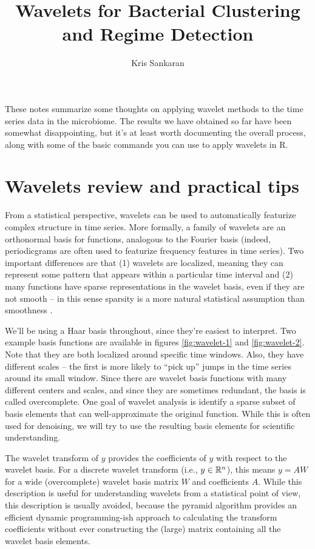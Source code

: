 \documentclass{article}
\title{Wavelets for Bacterial Clustering and Regime Detection}
\author{Kris Sankaran}
\begin{document}
\maketitle

These notes summarize some thoughts on applying wavelet methods to the
time series data in the microbiome. The results we have obtained so far have
been somewhat disappointing, but it's at least worth documenting the overall
process, along with some of the basic commands you can use to apply wavelets in
R.

\section{Wavelets review and practical tips}

From a statistical perspective, wavelets can be used to automatically featurize
complex structure in time series. More formally, a family of wavelets are an
orthonormal basis for functions, analogous to the Fourier basis (indeed,
periodicgrams are often used to featurize frequency features in time series).
Two important differences are that (1) wavelets are localized, meaning they can
represent some pattern that appears within a particular time interval and (2)
many functions have sparse representations in the wavelet basis, even if they
are not smooth -- in this sense sparsity is a more natural statistical
assumption than smoothness \cite{johnstone2011gaussian}.

We'll be using a Haar basis throughout, since they're easiest to interpret. Two
example basis functions are available in figures \ref{fig:wavelet-1} and
\ref{fig:wavelet-2}. Note that they are both localized around specific time
windows. Also, they have different scales -- the first is more likely to ``pick
up'' jumps in the time series around its small window. Since there are wavelet
basis functions with many different centers and scales, and since they are
sometimes redundant, the basis is called overcomplete. One goal of wavelet
analysis is identify a sparse subset of basis elements that can well-approximate
the original function. While this is often used for denoising, we will try to
use the resulting basis elements for scientific understanding.

The wavelet transform of $y$ provides the coefficients of $y$ with respect to
the wavelet basis. For a discrete wavelet transform (i.e., $y \in \mathbb{R}^{n}$),
this means $y = AW$ for a wide (overcomplete) wavelet basis matrix $W$ and
coefficients $A$. While this description is useful for understanding wavelets
from a statistical point of view, this description is usually avoided, because
the pyramid algorithm provides an efficient dynamic programming-ish approach to
calculating the transform coefficients without ever constructing the (large)
matrix containing all the wavelet basis elements.
\end{document}
